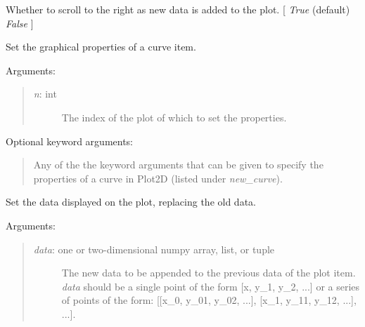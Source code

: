 \documentclass[letterpaper,10pt,english]{sphinxmanual}
\begin{document}
\begin{fulllineitems}

\begin{fulllineitems}
\label{api:mpl.Chart2D.scroll_to_end}
Whether to scroll to the right as new data is added to the plot.
{[} \emph{True} (default) \textbar{} \emph{False} {]}

\end{fulllineitems}


\begin{fulllineitems}
\label{api:mpl.Chart2D.set_curve_properties}
Set the graphical properties of a curve item.

Arguments:
\begin{quote}
\begin{description}
\item[{\emph{n}: int}] \leavevmode
The index of the plot of which to set the properties.

\end{description}
\end{quote}

Optional keyword arguments:
\begin{quote}

Any of the the keyword arguments that can be given to specify the 
properties of a curve in Plot2D (listed under \emph{new\_curve}).
\end{quote}

\end{fulllineitems}


\begin{fulllineitems}
\label{api:mpl.Chart2D.set_data}
Set the data displayed on the plot, replacing the old data.

Arguments:
\begin{quote}
\begin{description}
\item[{\emph{data}: one or two-dimensional numpy array, list, or tuple}] \leavevmode
The new data to be appended to the previous data of the plot item.
\emph{data} should be a single point of the form {[}x, y\_1, y\_2, ...{]} or a
series of points of the form: 
{[}{[}x\_0, y\_01, y\_02, ...{]}, {[}x\_1, y\_11, y\_12, ...{]}, ...{]}.


\end{description}
\end{quote}
\end{fulllineitems}
\end{fulllineitems}
\end{document}
